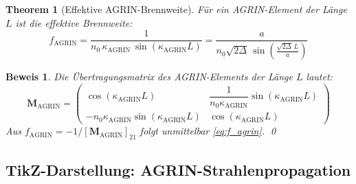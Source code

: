 ﻿\documentclass[12pt,a4paper]{article}
\newtheorem{theorem}{Theorem}[section]
\newtheorem{beweis}{Beweis}
\theoremstyle{definition}
\newcommand{\AGRIN}{\mathrm{AGRIN}}
\begin{document}
	\begin{theorem}[Effektive AGRIN-Brennweite]
		Für ein AGRIN-Element der Länge $L$ ist die effektive Brennweite:
		\begin{equation}
			\boxed{
				f_\AGRIN = \frac{1}{n_0\,\kappa_\AGRIN\,\sin(\kappa_\AGRIN L)}
				= \frac{a}{n_0\sqrt{2\Delta}\,\sin\!\left(\frac{\sqrt{2\Delta}\,L}{a}\right)}
			}
			\label{eq:f_agrin}
		\end{equation}
	\end{theorem}
	
	\begin{beweis}
		Die Übertragungsmatrix des AGRIN-Elements der Länge $L$ lautet:
		\begin{equation}
			\mathbf{M}_\AGRIN = \begin{pmatrix}
				\cos(\kappa_\AGRIN L) &
				\dfrac{1}{n_0\kappa_\AGRIN}\sin(\kappa_\AGRIN L) \\[1em]
				-n_0\kappa_\AGRIN\sin(\kappa_\AGRIN L) &
				\cos(\kappa_\AGRIN L)
			\end{pmatrix}
		\end{equation}
		Aus $f_\AGRIN = -1/[\mathbf{M}_\AGRIN]_{21}$ folgt unmittelbar
		\eqref{eq:f_agrin}. \qed
	\end{beweis}
	
	\subsection{TikZ-Darstellung: AGRIN-Strahlenpropagation}
	
\end{document}
